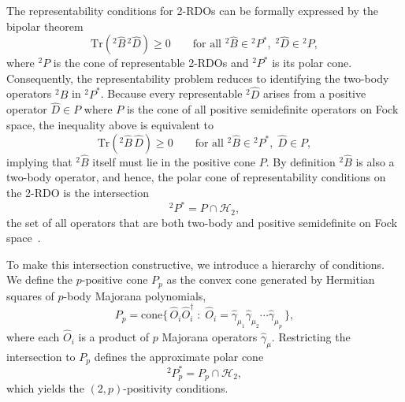 \documentclass[aps,prl,floatfix,twocolumn,showpacs,10pt]{revtex4-2}
\begin{document}
The representability conditions for 2-RDOs can be formally expressed by the bipolar theorem~\cite{Coleman2000, Kummer1967}
\begin{equation}
\mathrm{Tr}\!\left({}^{2}\!\hat B\, {}^{2}\!\hat D\right)\ge 0
\qquad\text{for all } {}^{2}\!\hat B\in{}^{2}P^{*},\; {}^{2}\!\hat D\in {}^{2}P,
\end{equation}
where ${}^{2}P$ is the cone of representable 2-RDOs and ${}^{2}P^{*}$ is its polar cone.  Consequently, the representability problem reduces to identifying the two-body operators ${}^{2}\!\hat B$ in ${}^{2}P^{*}$.  Because every representable ${}^{2}\!\hat D$ arises from a positive operator $\hat D\in P$ where $P$ is the cone of all positive semidefinite operators on Fock space, the inequality above is equivalent to
\begin{equation}
\mathrm{Tr}\!\left({}^{2}\!\hat B\, \hat D\right)\ge0
\qquad\text{for all } {}^{2}\!\hat B\in{}^{2}P^{*},\; \hat D\in P,
\end{equation}
implying that ${}^{2}\!\hat B$ itself must lie in the positive cone $P$.  By definition ${}^{2}\!\hat B$ is also a two-body operator, and hence, the polar cone of representability conditions on the 2-RDO is the intersection
\begin{equation}
{}^{2}P^{*} = P \cap \mathcal{H}_{2},
\end{equation}
the set of all operators that are both two-body and positive semidefinite on Fock space~\cite{Erdahl1978}.

To make this intersection constructive, we introduce a hierarchy of conditions.  We define the $p$-positive cone $P_{p}$ as the convex cone generated by Hermitian squares of $p$-body Majorana polynomials,
\begin{equation}
P_{p} = \mathrm{cone}\Big\{\,
\hat O_i \hat O_i^{\dagger}
\;:\;
\hat O_i = \hat\gamma_{\mu_1}\hat\gamma_{\mu_2}\cdots\hat\gamma_{\mu_p}
\,\Big\},
\end{equation}
where each $\hat O_i$ is a product of $p$ Majorana operators $\hat\gamma_{\mu}$.  Restricting the intersection to $P_{p}$ defines the approximate polar cone
\begin{equation}
{}^{2}P^{*}_{p} = P_{p} \cap \mathcal{H}_{2},
\end{equation}
which yields the $(2,p)$-positivity conditions.
\end{document}
